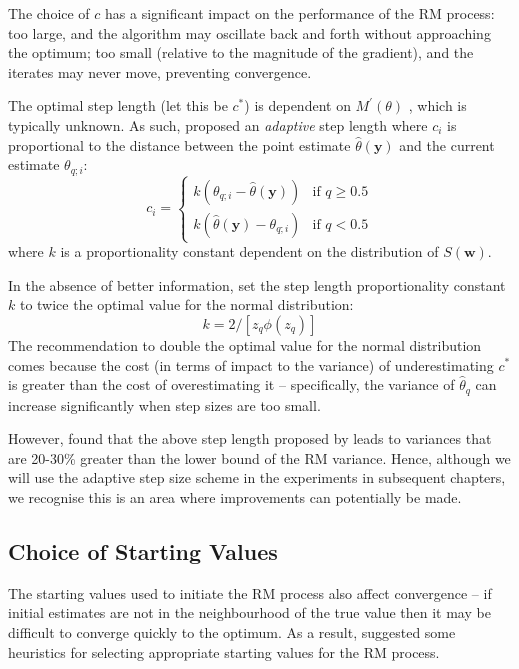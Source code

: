 The choice of $c$ has a significant impact on the performance of the RM process: too large, and the algorithm may oscillate back and forth without approaching the optimum; too small (relative to the magnitude of the gradient), and the iterates may never move, preventing convergence.

The optimal step length (let this be $c^*$) is dependent on $M^\prime(\theta)$ \cite{LlyodBotev2015}, which is typically unknown. As such, \citet{Garthwaite1992} proposed an \textit{adaptive} step length where $c_i$ is proportional to the distance between the point estimate $\hat\theta(\bm{y})$ and the current estimate $\theta_{q; i}$:\begin{equation} c_i = \begin{cases}
    k\left(\theta_{q; i} - \hat\theta(\bm{y}) \right) &\text{if $q \geq 0.5$} \\
    k\left(\hat\theta(\bm{y}) - \theta_{q; i}\right) &\text{if $q < 0.5$}
\end{cases}
\end{equation}
where $k$ is a proportionality constant dependent on the distribution of $S(\bm{w})$.

In the absence of better information, \citet{Garthwaite1992} set the step length proportionality constant $k$ to twice the optimal value for the normal distribution: \[
k = 2/\left[z_q \phi(z_q) \right]
\]
The recommendation to double the optimal value for the normal distribution comes because the cost (in terms of impact to the variance) of underestimating $c^*$ is greater than the cost of overestimating it -- specifically, the variance of $\hat\theta_q$ can increase significantly when step sizes are too small.

However, \citet{LlyodBotev2015} found that the above step length proposed by \citet{Garthwaite1992} leads to variances that are 20-30\% greater than the lower bound of the RM variance. Hence, although we will use the adaptive step size scheme in the experiments in subsequent chapters, we recognise this is an area where improvements can potentially be made.

\subsection{Choice of Starting Values}

The starting values used to initiate the RM process also affect convergence -- if initial estimates are not in the neighbourhood of the true value then it may be difficult to converge quickly to the optimum. As a result, \citet{Garthwaite1992} suggested some heuristics for selecting appropriate starting values for the RM process.

